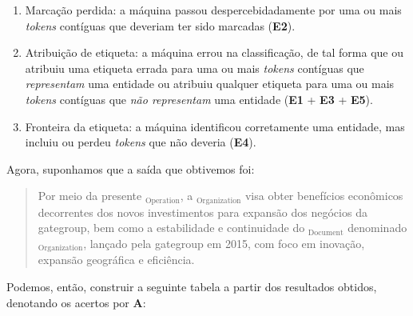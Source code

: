 \documentclass[11pt]{report}
\begin{document}
\begin{enumerate}[label=\textbf{e\arabic*.}]
  \item Marcação perdida: a máquina passou despercebidadamente por uma ou mais \textit{tokens} contíguas que deveriam ter sido marcadas (\textbf{E2}).
  \item Atribuição de etiqueta: a máquina errou na classificação, de tal forma que ou atribuiu uma etiqueta errada  para uma ou mais \textit{tokens}
  contíguas que \textit{representam} uma entidade ou atribuiu qualquer etiqueta para uma ou mais \textit{tokens} contíguas que \textit{não representam} uma entidade
  (\textbf{E1} + \textbf{E3} + \textbf{E5}).
  \item Fronteira da etiqueta: a máquina identificou corretamente uma entidade, mas incluiu ou perdeu \textit{tokens} que não deveria (\textbf{E4}).
\end{enumerate}

Agora, suponhamos que a saída que obtivemos foi:

\begin{quote}
  \begin{varwidth}{0.89\textwidth}
  Por meio da presente $_{\text{Operation}}$, a $_{\text{Organization}}$ visa obter benefícios econômicos decorrentes dos novos investimentos
  para expansão dos negócios da gategroup,
  bem como a  estabilidade e  continuidade do $_{\text{Document}}$ denominado $_{\text{Organization}}$, lançado pela gategroup
  em 2015, com foco em inovação, expansão geográfica e eficiência.
  \end{varwidth}
\end{quote}

Podemos, então, construir a seguinte tabela a partir dos resultados obtidos, denotando os acertos por \textbf{A}:
\end{document}
